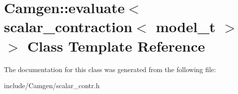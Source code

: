 \hypertarget{a00189}{}\section{Camgen\+:\+:evaluate$<$ scalar\+\_\+contraction$<$ model\+\_\+t $>$ $>$ Class Template Reference}
\label{a00189}


The documentation for this class was generated from the following file\+:\begin{DoxyCompactItemize}
\item 
include/\+Camgen/scalar\+\_\+contr.\+h\end{DoxyCompactItemize}
